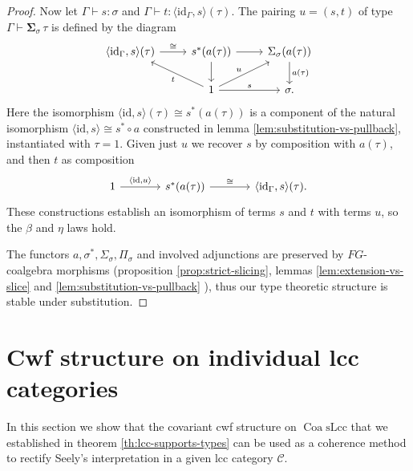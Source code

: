 \documentclass[a4paper]{article}
\theoremstyle{remark}
\theoremstyle{definition}
\begin{document}
\begin{proof}
  Now let $\Gamma \vdash s : \sigma$ and $\Gamma \vdash t : \langle \mathrm{id}_\Gamma, s \rangle(\tau)$.
  The pairing $u = (s, t)$ of type $\Gamma \vdash \mathbf{\Sigma}_\sigma \, \tau$ is defined by the diagram
  \begin{equation}
    \begin{tikzcd}
      \langle \mathrm{id}_\Gamma, s \rangle(\tau) \arrow[r, "\cong"] & s^*(a(\tau)) \arrow[r] \arrow[d] & \Sigma_\sigma(a(\tau)) \arrow[d, "a(\tau)"] \\
      & 1 \arrow[ul, "t"] \arrow[r, "s"] \arrow[ur, "u"] & \sigma.
    \end{tikzcd}
  \end{equation}
  Here the isomorphism $\langle \mathrm{id}, s \rangle(\tau) \cong s^*(a(\tau))$ is a component of the natural isomorphism $\langle \mathrm{id}, s \rangle \cong s^* \circ a$ constructed in lemma \ref{lem:substitution-vs-pullback}, instantiated with $\tau = 1$.
  Given just $u$ we recover $s$ by composition with $a(\tau)$, and then $t$ as composition
  \begin{equation}
    \begin{tikzcd}[column sep=large]
      1 \arrow[r, "{\langle \mathrm{id}, u \rangle}"] & s^*(a(\tau)) \arrow[r, "\cong"] & \langle \mathrm{id}_\Gamma, s \rangle(\tau).
    \end{tikzcd}
  \end{equation}
  These constructions establish an isomorphism of terms $s$ and $t$ with terms $u$, so the $\beta$ and $\eta$ laws hold.

  The functors $a, \sigma^*, \Sigma_\sigma, \Pi_\sigma$ and involved adjunctions are preserved by $FG$-coalgebra morphisms (proposition \ref{prop:strict-slicing}, lemmas \ref{lem:extension-vs-slice} and \ref{lem:substitution-vs-pullback} ), thus our type theoretic structure is stable under substitution.
\end{proof}

\section{Cwf structure on individual lcc categories}
\label{sec:applications}

In this section we show that the covariant cwf structure on $\operatorname{Coa} \mathrm{sLcc}$ that we established in theorem \ref{th:lcc-supports-types} can be used as a coherence method to rectify Seely's interpretation in a given lcc category $\mathcal{C}$.
\end{document}
